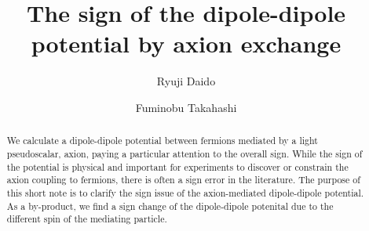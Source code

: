 \documentclass[12pt, a4paper]{article}
\begin{document}
%
%
\setcounter{footnote}{0}
\setcounter{figure}{0}
\setcounter{table}{0}
\allowdisplaybreaks
\setcounter{footnote}{0}
\setcounter{figure}{0}
\setcounter{table}{0}



\title{\bf \large 
The sign of the dipole-dipole potential by axion exchange}
\author[1]{{\normalsize Ryuji Daido}}
\author[1,2]{{\normalsize Fuminobu Takahashi}}




\date{}

\maketitle


\thispagestyle{fancy}
\cfoot{\thepage}
\renewcommand{\headrulewidth}{0pt}



\begin{abstract}
\noindent
We calculate a dipole-dipole potential  between fermions mediated by a light pseudoscalar, axion, 
paying a particular attention to the overall sign.  While the sign of the potential is  physical and important
for experiments to discover or constrain  the axion coupling to fermions,  there is often a sign error 
in the literature. The purpose of this short note is to clarify the sign issue of the axion-mediated dipole-dipole 
potential. As a by-product, we find a sign change of the dipole-dipole potenital due to the different spin
of the mediating particle.



\end{abstract}

\clearpage
\end{document}
